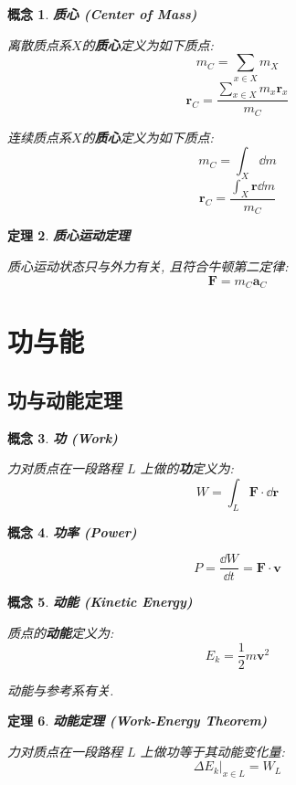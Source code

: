 \documentclass[UTF8]{ctexart}
\newcommand{\<}{\langle}
\renewcommand{\>}{\rangle}                              %
\newenvironment{dfn_box}{
    \begin{tcolorbox}[enhanced, colback=dfn_green2, boxrule=0pt, frame hidden,
        borderline west={0.7mm}{0.1mm}{dfn_green1},breakable]
    }
    {\end{tcolorbox}}
\newenvironment{thm_box}{
    \begin{tcolorbox}[enhanced, colback=thm_blue2, boxrule=0pt, frame hidden,
        borderline west={0.7mm}{0.1mm}{thm_blue1},breakable]
    }
    {\end{tcolorbox}}
\theoremstyle{MyStyle} %
\newtheorem{definition}{概念}[subsection]
\newenvironment{cpt}{\begin{dfn_box}\begin{definition}}{\end{definition}\end{dfn_box}}
\newtheorem{theorem}[definition]{定理}
\newenvironment{thm}{\begin{thm_box}\begin{theorem}}{\end{theorem}\end{thm_box}}
\begin{document}
        \begin{cpt}
            \textbf{质心 (Center of Mass)}

            离散质点系\(X\)的\textbf{质心}定义为如下质点: 
            \[m_C=\sum_{x\in X}m_X\]
            \[\bm{r}_C=\frac{\sum\limits_{x\in X}m_x\bm{r}_x}{m_C}\]

            连续质点系\(X\)的\textbf{质心}定义为如下质点:
            \[m_C=\int_X\dd m\]
            \[\bm{r}_C=\frac{\int_X\bm{r}\dd m}{m_C}\]
        \end{cpt}
        
        \begin{thm}
            \textbf{质心运动定理}

            质心运动状态只与外力有关, 且符合牛顿第二定律: 
            \[\bm{F}=m_C\bm{a}_C\]
        \end{thm}

\section{功与能}

    \subsection{功与动能定理}
        
        \begin{cpt}
            \textbf{功 (Work)}

            力对质点在一段路程 \(L\) 上做的\textbf{功}定义为: 
            \[W=\int_L\bm{F}\cdot\dd\bm{r}\]
        \end{cpt}
        
        \begin{cpt}
            \textbf{功率 (Power)}

            \[P=\frac{\dd W}{\dd t}=\bm{F}\cdot\bm{v}\]
        \end{cpt}
        
        \begin{cpt}
            \textbf{动能 (Kinetic Energy)}

            质点的\textbf{动能}定义为: 
            \[E_k=\frac{1}{2}m\bm{v}^2\]

            动能与参考系有关. 
        \end{cpt}
        
        \begin{thm}
            \textbf{动能定理 (Work-Energy Theorem)}

            力对质点在一段路程 \(L\) 上做功等于其动能变化量: 
            \[\Delta E_k|_{x\in L}=W_L\]
        \end{thm}
        
\end{document}
